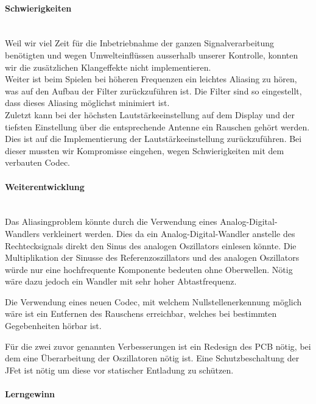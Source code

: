 \paragraph{Schwierigkeiten}\mbox{}\\

Weil wir viel Zeit für die Inbetriebnahme der ganzen Signalverarbeitung benötigten und wegen Umwelteinflüssen ausserhalb unserer Kontrolle, konnten wir die zusätzlichen Klangeffekte nicht implementieren.\\
Weiter ist beim Spielen bei höheren Frequenzen ein leichtes Aliasing zu hören, was auf den Aufbau der Filter zurückzuführen ist. Die Filter sind so eingestellt, dass dieses Aliasing möglichst minimiert ist.\\
Zuletzt kann bei der höchsten Lautstärkeeinstellung auf dem Display und der tiefsten Einstellung über die entsprechende Antenne ein Rauschen gehört werden. Dies ist auf die Implementierung der Lautstärkeeinstellung zurückzuführen. Bei dieser mussten wir Kompromisse eingehen, wegen Schwierigkeiten mit dem verbauten Codec.

\paragraph{Weiterentwicklung}\mbox{}\\

Das Aliasingproblem könnte durch die Verwendung eines Analog-Digital-Wandlers verkleinert werden. Dies da ein Analog-Digital-Wandler anstelle des Rechtecksignals direkt den Sinus des analogen Oszillators einlesen könnte. Die Multiplikation der Sinusse des Referenzoszillators und des analogen Oszillators würde nur eine hochfrequente Komponente bedeuten ohne Oberwellen. Nötig wäre dazu jedoch ein Wandler mit sehr hoher Abtastfrequenz.

Die Verwendung eines neuen Codec, mit welchem Nullstellenerkennung möglich wäre ist ein Entfernen des Rauschens erreichbar, welches bei bestimmten Gegebenheiten hörbar ist.

Für die zwei zuvor genannten Verbesserungen ist ein Redesign des PCB nötig, bei dem eine Überarbeitung der Oszillatoren nötig ist. Eine Schutzbeschaltung der JFet ist nötig um diese vor statischer Entladung zu schützen.

\paragraph{Lerngewinn} \mbox{}\\

